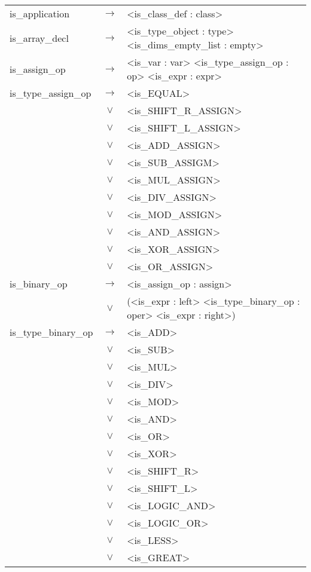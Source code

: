 \documentclass[a4paper]{article}
\begin{document}
\cleardoublepage
\begin{longtable}{lcl}
	is\_application				& $\to$ & <is\_class\_def : class> \\
	is\_array\_decl 			& $\to$ & <is\_type\_object : type> <is\_dims\_empty\_list : empty> \\
	is\_assign\_op				& $\to$ & <is\_var : var> <is\_type\_assign\_op : op> <is\_expr : expr> \\
	is\_type\_assign\_op		& $\to$ & <is\_EQUAL> \\
								& $\vee$ & <is\_SHIFT\_R\_ASSIGN> \\
								& $\vee$ & <is\_SHIFT\_L\_ASSIGN> \\
								& $\vee$ & <is\_ADD\_ASSIGN> \\
								& $\vee$ & <is\_SUB\_ASSIGM> \\
								& $\vee$ & <is\_MUL\_ASSIGN> \\
								& $\vee$ & <is\_DIV\_ASSIGN> \\
								& $\vee$ & <is\_MOD\_ASSIGN> \\
								& $\vee$ & <is\_AND\_ASSIGN> \\
								& $\vee$ & <is\_XOR\_ASSIGN> \\
								& $\vee$ & <is\_OR\_ASSIGN> \\
	is\_binary\_op				& $\to$ & <is\_assign\_op : assign> \\
								& $\vee$ & (<is\_expr : left> <is\_type\_binary\_op : oper> <is\_expr : right>) \\
	is\_type\_binary\_op		& $\to$ & <is\_ADD> \\
								& $\vee$ & <is\_SUB> \\
								& $\vee$ & <is\_MUL> \\
								& $\vee$ & <is\_DIV> \\
								& $\vee$ & <is\_MOD> \\
								& $\vee$ & <is\_AND> \\
								& $\vee$ & <is\_OR> \\
								& $\vee$ & <is\_XOR> \\
								& $\vee$ & <is\_SHIFT\_R>\\
								& $\vee$ & <is\_SHIFT\_L> \\
								& $\vee$ & <is\_LOGIC\_AND>\\
								& $\vee$ & <is\_LOGIC\_OR> \\
								& $\vee$ & <is\_LESS> \\
								& $\vee$ & <is\_GREAT> \\

\end{longtable}
\end{document}
